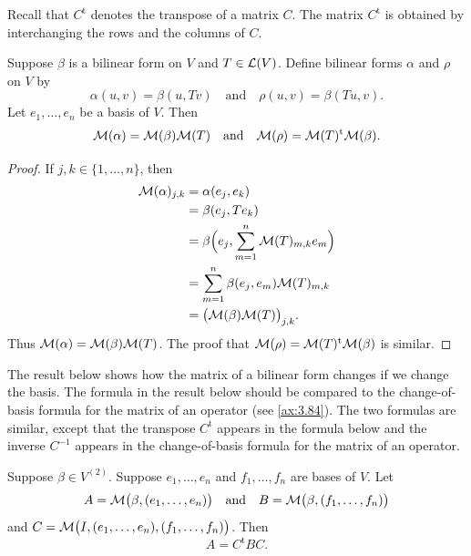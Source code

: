 Recall that $C^{\mathrm{t}}$ denotes the transpose of a matrix $C$. The matrix
$C^{\mathrm{t}}$ is obtained by interchanging the rows and the columns of $C$.

\begin{result}\label{ax:9.6}
Suppose $\beta$ is a bilinear form on $V$ and $T\in\mathcal{L}(V)$. Define bilinear
forms $\alpha$ and $\rho$ on $V$ by
\[ \alpha(u,v) = \beta(u,Tv) \quad\text{and}\quad \rho(u,v) = \beta(Tu,v). \]
Let $e_1,\dots,e_n$ be a basis of $V$. Then
\[ \mathcal{M}(\alpha) = \mathcal{M}(\beta)\mathcal{M}(T) \quad\text{and}\quad
   \mathcal{M}(\rho) = \mathcal{M}(T)^{\mathrm{t}}\mathcal{M}(\beta). \]
\end{result}

\begin{proof}
If $j,k\in\{1,\dots,n\}$, then
\begin{align*}
\mathcal{M}(\alpha)_{j,k} &= \alpha(e_j,e_k)\\
  &= \beta(e_j,Te_k)\\
  &= \beta\Bigl(e_j,\sum_{m=1}^n\mathcal{M}(T)_{m,k}e_m\Bigr)\\
  &= \sum_{m=1}^n\beta(e_j,e_m)\mathcal{M}(T)_{m,k}\\
  &= \bigl(\mathcal{M}(\beta)\mathcal{M}(T)\bigr)_{j,k}.
\end{align*}
Thus $\mathcal{M}(\alpha)=\mathcal{M}(\beta)\mathcal{M}(T)$. The proof that
$\mathcal{M}(\rho)=\mathcal{M}(T)^{\mathrm{t}}\mathcal{M}(\beta)$ is similar.
\end{proof}

The result below shows how the matrix of a bilinear form changes if we change
the basis. The formula in the result below should be compared to the
change-of-basis formula for the matrix of an operator (see \ref{ax:3.84}). The
two formulas are similar, except that the transpose $C^{\mathrm{t}}$ appears in
the formula below and the inverse $C^{-1}$ appears in the change-of-basis
formula for the matrix of an operator.

\begin{result}\label{ax:9.7}
Suppose $\beta\in V^{(2)}$. Suppose $e_1,\dots,e_n$ and $f_1,\dots,f_n$ are
bases of $V$. Let
\[ A = \mathcal{M}\bigl(\beta,(e_1,\dots,e_n)\bigr) \quad\text{and}\quad
   B = \mathcal{M}\bigl(\beta,(f_1,\dots,f_n)\bigr) \]
and $C=\mathcal{M}\bigl(I,(e_1,\dots,e_n),(f_1,\dots,f_n)\bigr)$. Then
\[ A = C^{\mathrm{t}}BC. \]
\end{result}

